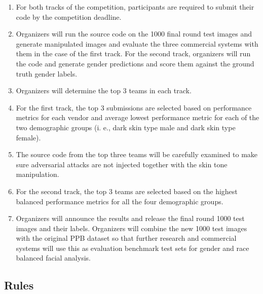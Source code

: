 \documentclass[11pt, oneside]{article}
\begin{document}
\begin{enumerate}
    \item For both tracks of the competition, participants are required to submit their code by the competition deadline.
    \item Organizers will run the source code on the 1000 final round test images and generate manipulated images and evaluate the three commercial systems with them in the case of the first track. For the second track, organizers will run the code and generate gender predictions and score them against the ground truth gender labels.
    \item Organizers will determine the top 3 teams in each track. 
    \item For the first track, the top 3 submissions are selected based on performance metrics for each vendor and average lowest performance metric for each of the two demographic groups (i. e., dark skin type male and dark skin type female).
    \item The source code from the top three teams will be carefully examined to make sure adversarial attacks are not injected together with the skin tone manipulation.
    \item For the second track, the top 3 teams are selected based on the highest balanced performance metrics for all the four demographic groups.
    \item Organizers will announce the results and release the final round 1000 test images and their labels. Organizers will combine the new 1000 test images with the original PPB dataset so that further research and commercial systems will use this as evaluation benchmark test sets for gender and race balanced facial analysis.
\end{enumerate}


\subsection{Rules}
\end{document}
